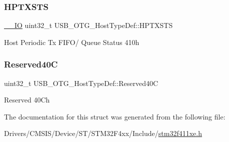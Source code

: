 \subsubsection{\texorpdfstring{H\+P\+T\+X\+S\+TS}{HPTXSTS}}
{\footnotesize\ttfamily \hyperlink{core__sc300_8h_aec43007d9998a0a0e01faede4133d6be}{\+\_\+\+\_\+\+IO} uint32\+\_\+t U\+S\+B\+\_\+\+O\+T\+G\+\_\+\+Host\+Type\+Def\+::\+H\+P\+T\+X\+S\+TS}

Host Periodic Tx F\+I\+F\+O/ Queue Status 410h \mbox{\label{struct_u_s_b___o_t_g___host_type_def_a0d4a262443e6d12c065adcafabf787ee}} 
\subsubsection{\texorpdfstring{Reserved40C}{Reserved40C}}
{\footnotesize\ttfamily uint32\+\_\+t U\+S\+B\+\_\+\+O\+T\+G\+\_\+\+Host\+Type\+Def\+::\+Reserved40C}

Reserved 40\+Ch 

The documentation for this struct was generated from the following file\+:\begin{DoxyCompactItemize}
\item 
Drivers/\+C\+M\+S\+I\+S/\+Device/\+S\+T/\+S\+T\+M32\+F4xx/\+Include/\hyperlink{stm32f411xe_8h}{stm32f411xe.\+h}\end{DoxyCompactItemize}
